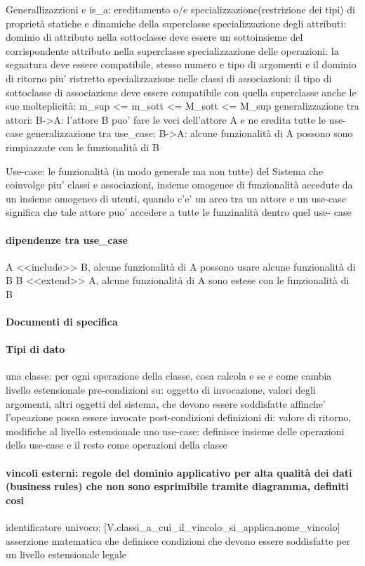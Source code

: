 \documentclass[12pt]{article}
\begin{document}
Generallizazzioni e is_a: ereditamento o/e specializzazione(restrizione dei tipi) di proprietà statiche e dinamiche della superclasse
	specializzazione degli attributi: dominio di attributo nella sottoclasse deve essere un sottoinsieme del corrispondente attributo nella superclasse
	specializzazione delle operazioni: la segnatura deve essere compatibile, stesso numero e tipo di argomenti e il dominio di ritorno piu' ristretto
	specializzazione nelle classi di associazioni: il tipo di sottoclasse di associazione deve essere compatibile con quella superclasse anche le sue molteplicità: m_sup <= m_sott <= M_sott <= M_sup
	generalizzazione tra attori: B->A: l'attore B puo' fare le veci dell'attore A e ne eredita tutte le use-case
	generalizzazione tra use_case: B->A: alcune funzionalità di A possono sono rimpiazzate con le funzionalità di B

Use-case: le funzionalità (in modo generale ma non tutte) del Sistema che coinvolge piu' classi e associazioni, insieme omogenee di funzionalità accedute da un insieme omogeneo di utenti, quando c'e' un arco tra un attore e un use-case significa che tale attore puo' accedere a tutte le funzinalità dentro quel use-	case
\paragraph{dipendenze tra use_case}
		A <<include>> B, alcune funzionalità di A possono usare alcune funzionalità di B 
		B <<extend>> A, alcune funzionalità di A sono estese con le funzionalità di B

\paragraph{Documenti di specifica}
\paragraph{Tipi di dato}
	una classe: per ogni operazione della classe, cosa calcola e se e come cambia livello estensionale
		pre-condizioni su: oggetto di invocazione, valori degli argomenti, altri oggetti del sistema, che devono essere soddisfatte affinche' l'opeazione possa essere invocate
		post-condizioni definizioni di: valore di ritorno, modifiche al livello estensionale
	uno use-case: definisce insieme delle operazioni dello use-case e il resto come operazioni della classe
\paragraph{vincoli esterni: regole del dominio applicativo per alta qualità dei dati (business rules) che non sono esprimibile tramite diagramma, definiti cosi}
		identificatore univoco: [V.classi_a_cui_il_vincolo_si_applica.nome_vincolo]
		asserzione matematica che definisce condizioni che devono essere soddisfatte per un livello estensionale legale
\end{document}
